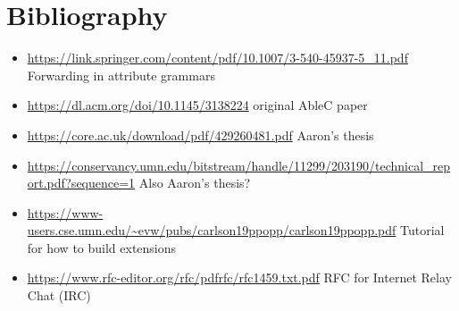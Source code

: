 \documentclass[main.tex]{subfiles}
\begin{document}
    \section{Bibliography}
	\begin{itemize}
	\item \url{https://link.springer.com/content/pdf/10.1007/3-540-45937-5_11.pdf} Forwarding in attribute grammars
	\item \url{https://dl.acm.org/doi/10.1145/3138224} original AbleC paper
	\item \url{https://core.ac.uk/download/pdf/429260481.pdf} Aaron's thesis
	\item \url{https://conservancy.umn.edu/bitstream/handle/11299/203190/technical_report.pdf?sequence=1} Also Aaron's thesis?
	\item \url{https://www-users.cse.umn.edu/~evw/pubs/carlson19ppopp/carlson19ppopp.pdf} Tutorial for how to build extensions
	\item \url{https://www.rfc-editor.org/rfc/pdfrfc/rfc1459.txt.pdf} RFC for Internet Relay Chat (IRC)
	\end{itemize}
\end{document}
